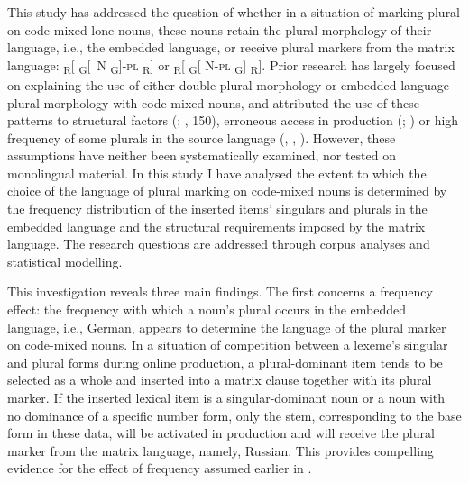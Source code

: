 \noindent This study has addressed the question of whether in a situation of marking plural on code-mixed lone nouns, these nouns retain the plural morphology of their language, i.e., the embedded language, or receive plural markers from the matrix language: {\textsubscript{R}[ \textsubscript{G}[~N \textsubscript{G}]-\textsc{pl} \textsubscript{R}]} or {\textsubscript{R}[ \textsubscript{G}[ N-\textsc{pl} \textsubscript{G}] \textsubscript{R}]}. Prior research has largely focused on explaining the use of either double plural morphology or embedded-language plural morphology with code-mixed nouns, and attributed the use of these patterns to structural factors (\citealt[91]{boumans-syntax-1998}; \citealt[91]{myers-scotton-contact-2002}, 150), erroneous access in production (\citealt[132--136]{myers-scotton-duelling-1993}; \citealt[1000]{myers-scotton-matching-1995}) or high frequency of some plurals in the source language (\citealt[151]{backus-two-1996}, \citeyear[97--99]{backus-evidence-1999}, \citeyear[93--100]{backus-units-2003}). However, these assumptions have neither been systematically examined, nor tested on monolingual material. In this study I have analysed the extent to which the choice of the language of plural marking on code-mixed nouns is determined by the frequency distribution of the inserted items’ singulars and plurals in the embedded language and the structural requirements imposed by the matrix language. The research questions are addressed through corpus analyses and statistical modelling.

This investigation reveals three main findings. The first concerns a frequency effect: the frequency with which a noun’s plural occurs in the embedded language, i.e., German, appears to determine the language of the plural marker on code-mixed nouns. In a situation of competition between a lexeme’s singular and plural forms during online production, a plural-dominant item tends to be selected as a whole and inserted into a matrix clause together with its plural marker. If the inserted lexical item is a singular-dominant noun or a noun with no dominance of a specific number form, only the stem, corresponding to the base form in these data, will be activated in production and will receive the plural marker from the matrix language, namely, Russian. This provides compelling evidence for the effect of frequency assumed earlier in \citep{backus-two-1996,backus-evidence-1999, backus-units-2003}.

